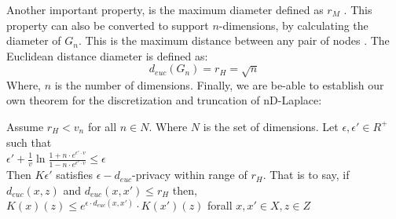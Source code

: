 Another important property, is the maximum diameter defined as $r_M$ \citep{9646489}.
This property can also be converted to support $n$-dimensions, by calculating the diameter of $G_n$.
This is the maximum distance between any pair of nodes \citep{HARARY1988277}. \newline
The Euclidean distance diameter is defined as:
\begin{equation}
  d_{euc}(G_n) = r_H = \sqrt{n}
\end{equation}
Where, $n$ is the number of dimensions. \newpage
Finally, we are be-able to establish our own theorem for the discretization and truncation of nD-Laplace:
\begin{theorem}
Assume $r_H < v_n$  for all $n \in N$. Where $N$ is the set of dimensions. Let $\epsilon, \epsilon' \in R^+$ such that \\
  $\epsilon' + \frac{1}{v} \ln \frac{1 + n \cdot e^{\epsilon' \cdot v}}{1 - n \cdot e^{\epsilon' \cdot v}} \leq \epsilon$ \\
  Then $K\epsilon'$ satisfies $\epsilon-d_{euc}$-privacy within range
  of $r_H$. That is to say, if $d_{euc}(x, z)$ and $d_{euc}(x, x') \leq r_H$ then, \\
  $K(x)(z) \leq e^{\epsilon \cdot d_{euc} (x, x')} \cdot K(x')(z)$ forall $x, x' \in X, z \in Z$ \citep{chatzikokolakis_constructing_2015} 
\end{theorem}


